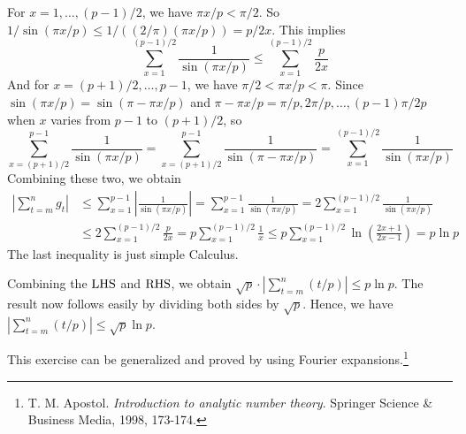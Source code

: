 \documentclass[../I&R.tex]{subfiles}
\begin{document}
For $x=1,\ldots,(p-1)/2$, we have $\pi x/p<\pi/2$. So $1/\sin(\pi x/p)\leq1/((2/\pi)(\pi x/p))=p/2x$. This implies $$\sum_{x=1}^{(p-1)/2} \frac{1}{\sin(\pi x/p)} \leq \sum_{x=1}^{(p-1)/2} \frac{p}{2x}$$
And for $x=(p+1)/2,\ldots,p-1$, we have $\pi/2<\pi x/p<\pi$. Since $\sin(\pi x/p)=\sin(\pi-\pi x/p)$ and $\pi-\pi x/p=\pi/p,2\pi/p,\ldots,(p-1)\pi/2p$ when $x$ varies from $p-1$ to $(p+1)/2$, so $$\sum_{x=(p+1)/2}^{p-1} \frac{1}{\sin(\pi x/p)}=\sum_{x=(p+1)/2}^{p-1} \frac{1}{\sin(\pi-\pi x/p)} = \sum_{x=1}^{(p-1)/2} \frac{1}{\sin(\pi x/p)}$$
Combining these two, we obtain
\begin{align*}
\left|\sum_{t=m}^n g_t\right| &\leq \sum_{x=1}^{p-1} \left|\frac{1}{\sin(\pi x/p)}\right| = \sum_{x=1}^{p-1} \frac{1}{\sin(\pi x/p)} = 2\sum_{x=1}^{(p-1)/2} \frac{1}{\sin(\pi x/p)} \\
&\leq 2\sum_{x=1}^{(p-1)/2} \frac{p}{2x} = p\sum_{x=1}^{(p-1)/2} \frac{1}{x} \leq p\sum_{x=1}^{(p-1)/2} \ln\left(\frac{2x+1}{2x-1}\right) = p\ln p
\end{align*}
The last inequality is just simple Calculus.

Combining the $\operatorname{LHS}$ and $\operatorname{RHS}$, we obtain $\sqrt{p}\cdot|\sum_{t=m}^n (t/p)|\leq p\ln p$. The result now follows easily by dividing both sides by $\sqrt{p}$. Hence, we have $|\sum_{t=m}^n (t/p)|\leq \sqrt{p}\ln p$.

This exercise can be generalized and proved by using Fourier expansions.\footnote{T. M. Apostol. \textit{Introduction to analytic number theory}. Springer Science \& Business Media, 1998, 173-174.}
\end{document}
